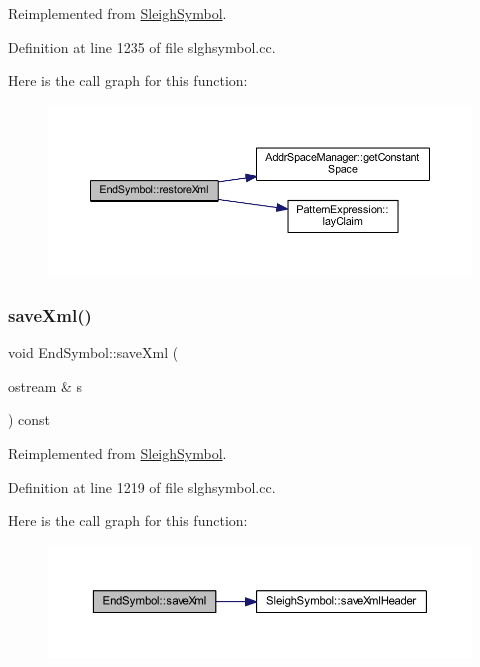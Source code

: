Reimplemented from \mbox{\hyperlink{class_sleigh_symbol_accaec1696f99366fb0e089a7fceb56a3}{Sleigh\+Symbol}}.



Definition at line 1235 of file slghsymbol.\+cc.

Here is the call graph for this function\+:
\nopagebreak
\begin{figure}[H]
\begin{center}
\leavevmode
\includegraphics[width=350pt]{class_end_symbol_a4b319014daff5bfe82e79d3b7e7b6402_cgraph}
\end{center}
\end{figure}
\mbox{\label{class_end_symbol_a282237b2af7aa91526261d94580c77b2}} 
\subsubsection{\texorpdfstring{saveXml()}{saveXml()}}
{\footnotesize\ttfamily void End\+Symbol\+::save\+Xml (\begin{DoxyParamCaption}\item[{ostream \&}]{s }\end{DoxyParamCaption}) const\hspace{0.3cm}{\ttfamily [virtual]}}



Reimplemented from \mbox{\hyperlink{class_sleigh_symbol_a83c9a32d16419d2277c5b9d542e1cf13}{Sleigh\+Symbol}}.



Definition at line 1219 of file slghsymbol.\+cc.

Here is the call graph for this function\+:
\nopagebreak
\begin{figure}[H]
\begin{center}
\leavevmode
\includegraphics[width=350pt]{class_end_symbol_a282237b2af7aa91526261d94580c77b2_cgraph}
\end{center}
\end{figure}
\mbox{\label{class_end_symbol_a78ad9229b9bab6735c31cd1fd0342729}} 
